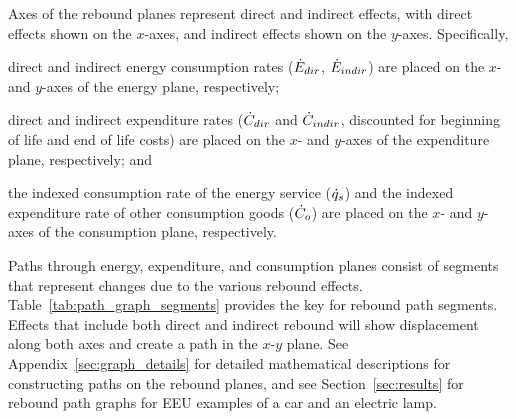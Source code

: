 \documentclass[12pt]{article}\usepackage[]{graphicx}\usepackage[]{xcolor}
\begin{document}
Axes of the rebound planes
represent direct and indirect effects, with
direct effects shown on the $x$-axes, and
indirect effects shown on the $y$-axes.
Specifically,
%
\begin{enumerate*}[label={(\roman*)}]

  \item direct and indirect energy consumption rates ($\dot{E}_{dir}$, $\dot{E}_{indir}$) are placed on
        the $x$- and $y$-axes of the energy plane, respectively;

  \item direct and indirect expenditure rates ($\dot{C}_{dir}$ and $\dot{C}_{indir}$,
        discounted for beginning of life and end of life costs) are placed on
        the $x$- and $y$-axes of the expenditure plane, respectively; and

  \item the indexed consumption rate of the energy service ($\dot{q}_s$) and
        the indexed expenditure rate of other consumption goods ($\dot{C}_o$) are placed on
        the $x$- and $y$-axes of the consumption plane, respectively.

\end{enumerate*}
%
Paths through energy, expenditure, and consumption planes
consist of segments that represent changes due to the various rebound effects.
Table~\ref{tab:path_graph_segments} provides the key for rebound path segments.
Effects that include both direct and indirect rebound
will show displacement along both axes and
create a path in the $x$-$y$ plane.
See Appendix~\ref{sec:graph_details} for
detailed mathematical descriptions for constructing paths on the rebound planes, and
see Section~\ref{sec:results} for rebound path graphs
for EEU examples of a car and an electric lamp.
\end{document}
